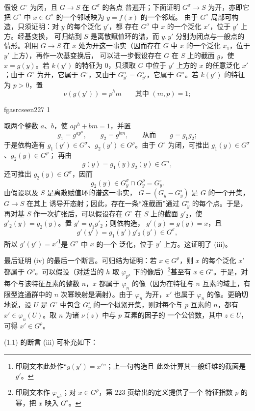 \documentclass[12pt,twoside,openany]{book}
\numberwithin{equation}{section}
\newcommand{\fgaunitid}{unbound}
\newcommand{\src}[1]{%
  \phantomsection
  \hypertarget{src:\fgaunitid:#1}{}%
  \hypertarget{fga.\fgaunitid.p#1}{}%
  \ifcsname fgasrcseen#1\endcsname\else
    \expandafter\gdef\csname fgasrcseen#1\endcsname{1}%
    \hypertarget{src:#1}{}%
  \fi
  \marginpar{\raggedleft\footnotesize\sffamily #1}%
}
\theoremstyle{plain}
\theoremstyle{definition}
\theoremstyle{remark}
\begin{document}
假设 $G^\circ$ 为闭，且 $G\longrightarrow S$ 在 $G^\sigma$ 的各点
普遍开；下面证明 $G^\sigma\longrightarrow S$ 为开，亦即它把
$G^\sigma$ 中 $x\in G^\sigma$ 的一个邻域映为 $y=f(x)$ 的一个邻域。
由于 $G^\sigma$ 局部可构造，只须证明：对 $y$ 的每个泛化 $y'$，都
存在 $G^\sigma$ 中 $x$ 的一个泛化 $x'$，位于 $y'$ 上方。经基变换，
可归结到 $S$ 是离散赋值环的谱，而 $y,y'$ 分别为闭点与一般点的
情形。利用 $G\longrightarrow S$ 在 $x$ 处为开这一事实（因而存在
$G$ 中 $x$ 的一个泛化 $x_1$，位于 $y'$ 上方），再作一次基变换后，
可以进一步假设存在 $G$ 在 $S$ 上的截面 $g$，使 $x=g(y)$。若
$k(y')$ 的特征为 0，只须取 $G$ 中位于 $y'$ 上方的 $x$ 的任意泛化
$x'$；由于 $G^\tau$ 为开，它属于 $G^\tau$，又由于
$G_{y'}^\sigma=G_{y'}^\tau$，它属于 $G^\sigma$。若 $k(y')$ 的特征为
$p>0$，置
\[
\nu(g(y'))=p^hm\qquad\text{其中 }(m,p)=1 ;
\]

\src{227}
取两个整数 $a$、$b$，使 $ap^h+bm=1$，并置
\[
g_1=g^{ap^h},\qquad g_2=g^{bm},\qquad\text{从而}\qquad g=g_1g_2 ;
\]
于是依构造有 $g_1(y')\in G^\sigma$、$g_2(y')\in G^\rho$。由于
$G^\circ$ 为闭，可推出 $g_1(y)\in G^\sigma$、$g_2(y)\in G^\rho$；
再由
\[
g(y)=g_1(y)g_2(y)\in G^\sigma,
\]
还可推出 $g_2(y)\in G^\sigma$，因而
\[
g_2(y)\in G_y^\sigma\cap G_y^\rho=G_y^\circ.
\]
由假设以及 $S$ 是离散赋值环的谱这一事实，
$G-(G_y-G_y^\circ)$ 是 $G$ 的一个开集，$G\longrightarrow S$ 在其上
诱导开态射；因此，存在一条“准截面”通过 $G_y^\circ$ 的每个点。于是，
再对基 $S$ 作一次扩张后，可以假设存在 $G^\circ$ 在 $S$ 上的截面
$g'_2$，使 $g'_2(y)=g_2(y)$。置 $g'=g_1g'_2$；则依构造，
$g'(y)=g(y)=x$，且
\[
g'(y')=g_1(y')g'_2(y')\in G^\sigma,
\]
所以 $g'(y')=x'$\footnote{印刷文本此处作“$g(y')=x'$”；上一句构造且
此处计算其一般纤维的截面是 $g'$。}是 $G^\sigma$ 中 $x$ 的一个
泛化，位于 $y'$ 上方。这证明了 (iii)。

最后证明 (iv) 的最后一个断言。可归结为证明：若 $x\in G^\rho$，则
$x$ 的每个泛化 $x'$ 都属于 $G^\rho$。可以假设（对适当的 $h$ 取
$\varphi_{p^h}$ 下的像后）\footnote{印刷文本作
$\varphi_{n^h}$；对 $x\in G^\rho$，第 223 页给出的定义提供了一个
特征指数 $p$ 的幂，把 $x$ 映入 $G^\circ$。}甚至有
$x\in G^\circ$。于是，对每个与该特征互素的整数 $n$，$x$ 都属于
$\varphi_n$ 的像（因为在特征与 $n$ 互素的域上，有限型连通群中的
$n$ 次幂映射是满射）。由于 $\varphi_n$ 为开，$x'$ 也属于
$\varphi_n$ 的像。更确切地说，设 $U$ 是 $G^\tau$ 中包含
$G_y^\circ$ 的一个拟紧开集，则对每个与 $p$ 互素的 $n$，都有
$x'\in\varphi_n(U)$。取 $n$ 为诸 $\nu(z)$ 中与 $p$ 互素的因子的
一个公倍数，其中 $z\in U$，可得 $x'\in G^\rho$。

(1.1) 的断言 (iii) 可补充如下：
\end{document}
